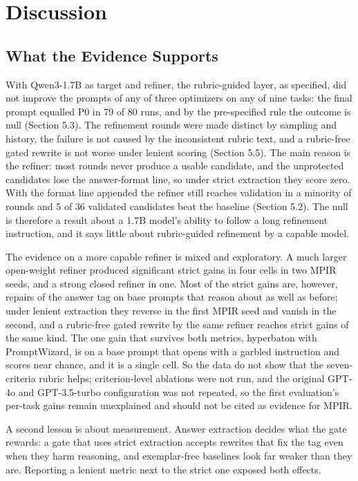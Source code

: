 \documentclass{ieeeaccess}
\begin{document}
\section{Discussion}

\subsection{What the Evidence Supports}

With Qwen3-1.7B as target and refiner, the rubric-guided layer, as specified, did not improve the prompts of any of three optimizers on any of nine tasks: the final prompt equalled P0 in 79 of 80 runs, and by the pre-specified rule the outcome is null (Section 5.3). The refinement rounds were made distinct by sampling and history, the failure is not caused by the inconsistent rubric text, and a rubric-free gated rewrite is not worse under lenient scoring (Section 5.5). The main reason is the refiner: most rounds never produce a usable candidate, and the unprotected candidates lose the answer-format line, so under strict extraction they score zero. With the format line appended the refiner still reaches validation in a minority of rounds and 5 of 36 validated candidates beat the baseline (Section 5.2). The null is therefore a result about a 1.7B model's ability to follow a long refinement instruction, and it says little about rubric-guided refinement by a capable model.

The evidence on a more capable refiner is mixed and exploratory. A much larger open-weight refiner produced significant strict gains in four cells in two MPIR seeds, and a strong closed refiner in one. Most of the strict gains are, however, repairs of the answer tag on base prompts that reason about as well as before; under lenient extraction they reverse in the first MPIR seed and vanish in the second, and a rubric-free gated rewrite by the same refiner reaches strict gains of the same kind. The one gain that survives both metrics, hyperbaton with PromptWizard, is on a base prompt that opens with a garbled instruction and scores near chance, and it is a single cell. So the data do not show that the seven-criteria rubric helps; criterion-level ablations were not run, and the original GPT-4o and GPT-3.5-turbo configuration was not repeated, so the first evaluation's per-task gains remain unexplained and should not be cited as evidence for MPIR.

A second lesson is about measurement. Answer extraction decides what the gate rewards: a gate that uses strict extraction accepts rewrites that fix the tag even when they harm reasoning, and exemplar-free baselines look far weaker than they are. Reporting a lenient metric next to the strict one exposed both effects.
\end{document}
